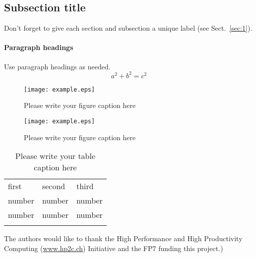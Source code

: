 \subsection{Subsection title}
\label{subsec:1}
Don't forget to  give each section and subsection  a unique label (see
Sect.~\ref{sec:1}).
\paragraph{Paragraph headings} Use paragraph headings as needed.
\begin{equation}
a^2+b^2=c^2
\end{equation}

\begin{figure}
  \texttt{[image: example.eps]}
\caption{Please write your figure caption here}
\label{fig:1}       %
\end{figure}
%
\begin{figure*}
  \texttt{[image: example.eps]}
\caption{Please write your figure caption here}
\label{fig:2}       %
\end{figure*}
%
\begin{table}
\caption{Please write your table caption here}
\label{tab:1}       %
\begin{tabular}{lll}
\hline\noalign{\smallskip}
first & second & third  \\
\noalign{\smallskip}\hline\noalign{\smallskip}
number & number & number \\
number & number & number \\
\noalign{\smallskip}\hline
\end{tabular}
\end{table}

\begin{acknowledgements}
The  authors  would  like  to  thank the  High  Performance  and  High
Productivity  Computing  (\url{www.hp2c.ch})  Initiative and  the  FP7
funding this project.)
\end{acknowledgements}






